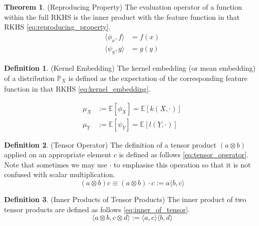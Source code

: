 \documentclass[twoside]{article} \usepackage{aistats2017}
\theoremstyle{definition}
\newtheorem{definition}{Definition}[section]
\theoremstyle{definition}
\newtheorem{theorem}{Theorem}[section]
\theoremstyle{remark}
\newcommand{\rv}[1]{\underline{#1}}
\newcommand{\expect}[1]{{\mathbb{E}[#1]}}
\newcommand{\inner}[2]{{\langle #1, #2 \rangle}}
\newcommand{\muX}{\mu_{\rv{X}}}
\newcommand{\muY}{\mu_{\rv{Y}}}
\newcommand{\phiX}{\phi_{\rv{X}}}
\newcommand{\psiY}{\psi_{\rv{Y}}}
\begin{document}
	\begin{theorem} \label{thm:reproducing_property}
		(Reproducing Property)
		The evaluation operator of a function within the full RKHS is the inner product with the feature function in that RKHS \eqref{eq:reproducing_property}.
		\begin{equation}
		\begin{aligned}
			\inner{\phi_{x}}{f} &= f(x) \\
			\inner{\psi_{y}}{g} &= g(y)
		\label{eq:reproducing_property}
		\end{aligned}
		\end{equation}	
	\end{theorem}

	\begin{definition} \label{def:kernel_embedding}
		(Kernel Embedding)
		The kernel embedding (or mean embedding) of a distribution $\mathbb{P}_{\rv{X}}$ is defined as the expectation of the corresponding feature function in that RKHS \eqref{eq:kernel_embedding}.
		
		\begin{equation}
		\begin{aligned}
			\muX &:= \expect{\phiX} = \expect{k(\rv{X}, \cdot)} \\
			\muY &:= \expect{\psiY} = \expect{l(\rv{Y}, \cdot)}
		\label{eq:kernel_embedding}
		\end{aligned}
		\end{equation}	
	\end{definition}

	\begin{definition} \label{def:tensor_operator}
		(Tensor Operator)
		The definition of a tensor product $(a \otimes b)$ applied on an appropriate element $c$ is defined as follows \eqref{eq:tensor_operator}. Note that sometimes we may use $\cdot$ to emphasise this operation so that it is not confused with scalar multiplication.
		\begin{equation}
			(a \otimes b) c \equiv (a \otimes b) \cdot c := a \langle b, c \rangle
		\label{eq:tensor_operator}
		\end{equation}
	\end{definition}
	
	\begin{definition} \label{def:inner_of_tensor}
		(Inner Products of Tensor Products)
		The inner product of two tensor products are defined as follows \eqref{eq:inner_of_tensor}.
		\begin{equation}
			\inner{a \otimes b}{c \otimes d} := \inner{a}{c} \inner{b}{d}
		\label{eq:inner_of_tensor}
		\end{equation}
	\end{definition}
	
\end{document}
